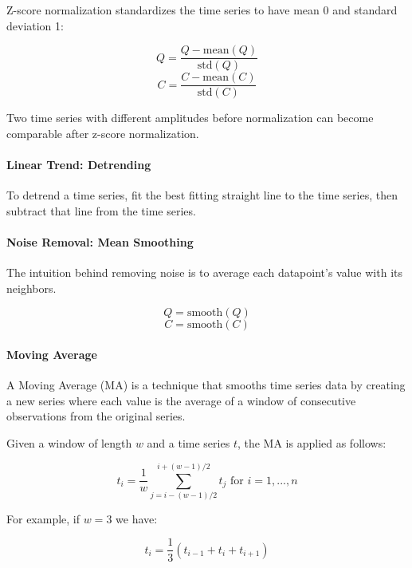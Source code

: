 Z-score normalization standardizes the time series to have mean 0 and standard deviation 1:

\begin{equation}
Q = \frac{Q - \text{mean}(Q)}{\text{std}(Q)}
\end{equation}
\begin{equation}
C = \frac{C - \text{mean}(C)}{\text{std}(C)}
\end{equation}

Two time series with different amplitudes before normalization can become comparable after z-score normalization.

\paragraph{Linear Trend: Detrending}

To detrend a time series, fit the best fitting straight line to the time series, then subtract that line from the time series.

\paragraph{Noise Removal: Mean Smoothing}

The intuition behind removing noise is to average each datapoint's value with its neighbors.

\begin{equation}
Q = \text{smooth}(Q)
\end{equation}
\begin{equation}
C = \text{smooth}(C)
\end{equation}

\paragraph{Moving Average}
A Moving Average (MA) is a technique that smooths time series data by creating a new series where each value is the average of a window of consecutive observations from the original series.

Given a window of length $w$ and a time series $t$, the MA is applied as follows:

\begin{equation}
t_i = \frac{1}{w} \sum_{j=i-(w-1)/2}^{i+(w-1)/2} t_j \text{ for } i = 1, ..., n
\end{equation}

For example, if $w=3$ we have:

\begin{equation}
t_i = \frac{1}{3} (t_{i-1} + t_i + t_{i+1})
\end{equation}

